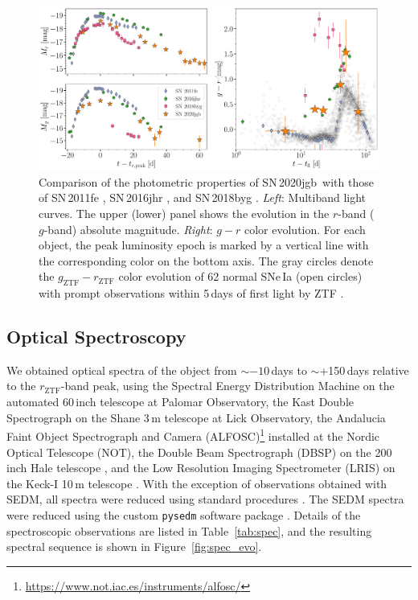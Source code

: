 \documentclass[twocolumn]{aastex631}
\newcommand{\sn}{SN\,2020jgb}
\begin{document}
\begin{CJK*}{UTF8}{gbsn}
\begin{figure}
    \centering
    \includegraphics[width=\textwidth]{photometry.pdf}
    \caption{Comparison of the photometric properties of \sn\ with those of SN\,2011fe \citep[normal SN\,Ia;][]{Pereira_2013}, SN\,2016jhr \citep[normal-luminosity He-shell DDet;][]{jiang_16jhr_2017}, and SN\,2018byg \citep[subluminous He-shell DDet;][]{de_18byg_2019}. \textit{Left}: Multiband light curves. The upper (lower) panel shows the evolution in the $r$-band ($g$-band) absolute magnitude. \textit{Right}: $g-r$ color evolution. For each object, the peak luminosity epoch is marked by a vertical line with the corresponding color on the bottom axis. The gray circles denote the $g_\mathrm{ZTF}-r_\mathrm{ZTF}$ color evolution of 62 normal SNe\,Ia (open circles) with prompt observations within 5\,days of first light by ZTF \citep{Bulla2020}. }
    \label{fig:photometry}
\end{figure}

\subsection{Optical Spectroscopy}\label{sec:optical_spec}
We obtained optical spectra of the object from $\sim$$-10$\,days to $\sim$+150\,days relative to the $r_\mathrm{ZTF}$-band peak, using the Spectral Energy Distribution Machine \citep[SEDM;][]{SEDM_2018} on the automated 60\,inch telescope \citep[P60;][]{P60_2006} at Palomar Observatory, the Kast Double Spectrograph \citep{miller1994kast} on the Shane 3\,m telescope at Lick Observatory, the Andalucia Faint Object Spectrograph and Camera (ALFOSC)\footnote{\url{https://www.not.iac.es/instruments/alfosc/}} installed at the Nordic Optical Telescope (NOT), the Double Beam Spectrograph (DBSP) on the 200\,inch Hale telescope \citep[P200;][]{P200_1982}, and the Low Resolution Imaging Spectrometer (LRIS) on the Keck-I 10\,m telescope \citep{Keck_1995}. With the exception of observations obtained with SEDM, all spectra were reduced using standard procedures \citep[e.g.,][]{Matheson_2000}. The SEDM spectra were reduced using the custom \texttt{pysedm} software package \citep{Rigault_pysedm_2019}. Details of the spectroscopic observations are listed in Table~\ref{tab:spec}, and the resulting spectral sequence is shown in Figure~\ref{fig:spec_evo}.


\end{CJK*}
\end{document}
